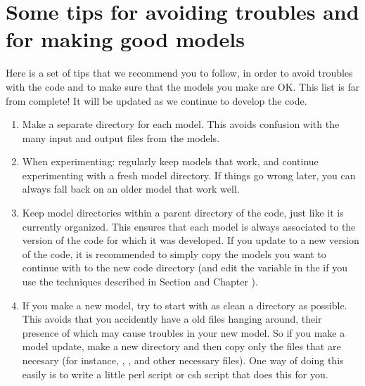 \documentclass[letterpaper,10pt,english]{sphinxmanual}
\begin{document}
\section{Some tips for avoiding troubles and for making good models}
\label{\detokenize{tipsandtricks:some-tips-for-avoiding-troubles-and-for-making-good-models}}
Here is a set of tips that we recommend you to follow, in order to avoid
troubles with the code and to make sure that the models you make are OK.
This list is far from complete! It will be updated as we continue to
develop the code.
\begin{enumerate}
%
\item {} 
Make a separate directory for each model. This avoids confusion with
the many input and output files from the models.

\item {} 
When experimenting: regularly keep models that work, and continue
experimenting with a fresh model directory. If things go wrong later, you
can always fall back on an older model that  work well.

\item {} 
Keep model directories within a parent directory of the code, just
like it is currently organized. This ensures that each model is always
associated to the version of the code for which it was developed.  If you
update to a new version of the code, it is recommended to simply copy the
models you want to continue with to the new code directory (and edit the
 variable in the  if you use the
techniques described in Section {\hyperref[\detokenize{installation:sec-special-purpose-compile}]{}} and
Chapter {\hyperref[\detokenize{internalsetup:chap-internal-setup}]{}}).

\item {} 
If you make a new model, try to start with as clean a directory as
possible. This avoids that you accidently have a old files hanging around,
their presence of which may cause troubles in your new model.  So if you
make a model update, make a new directory and then copy only the files
that are necesary (for instance, ,
,  and other
necessary files). One way of doing this easily is to write a little perl
script or csh script that does this for you.


\end{enumerate}
\end{document}
